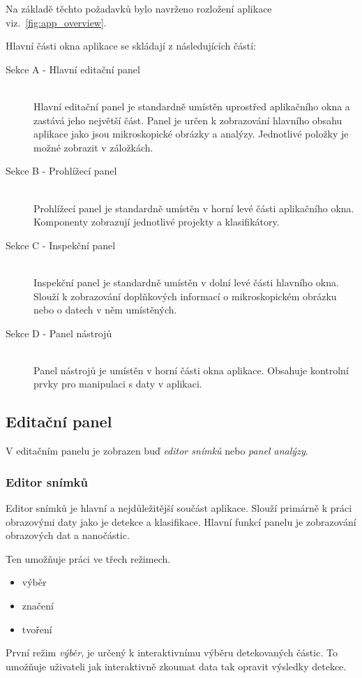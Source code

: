 \documentclass[11pt,twoside,a4paper,table]{book}
\begin{document}
Na základě těchto požadavků bylo navrženo rozložení aplikace viz.~\ref{fig:app_overview}. 

Hlavní části okna aplikace se skládají z následujících částí:
\begin{description}
	\item[Sekce A - Hlavní editační panel] \hfill \\
	Hlavní editační panel je standardně umístěn uprostřed aplikačního okna a zastává jeho největší část. Panel je určen k zobrazování hlavního obsahu aplikace jako jsou mikroskopické obrázky a analýzy. Jednotlivé položky je možné zobrazit v záložkách. 
	\item[Sekce B - Prohlížecí panel] \hfill \\
	Prohlížecí panel je standardně umístěn v horní levé části aplikačního okna. Komponenty zobrazují jednotlivé projekty a klasifikátory.
	\item[Sekce C - Inspekční panel] \hfill \\
	Inspekční panel je standardně umístěn v dolní levé části hlavního okna. Slouží k zobrazování doplňkových informací o mikroskopickém obrázku nebo o datech v něm umístěných.
	\item[Sekce D - Panel nástrojů] \hfill \\
	Panel nástrojů je umístěn v horní části okna aplikace. Obsahuje kontrolní prvky pro manipulaci s daty v aplikaci.
\end{description}
\subsection{Editační panel}
V editačním panelu je zobrazen buď \textit{editor snímků} nebo \textit{panel analýzy}.

\subsubsection{Editor snímků}
Editor snímků je hlavní a nejdůležitější součást aplikace. Slouží primárně k práci obrazovými daty jako je detekce a klasifikace. Hlavní funkcí panelu je zobrazování obrazových dat a nanočástic.

Ten umožňuje práci ve třech režimech.
\begin{itemize}
\item výběr
\item značení
\item tvoření
\end{itemize}

První režim \textit{výběr}, je určený k interaktivnímu výběru detekovaných částic. To umožňuje uživateli jak interaktivně zkoumat data tak opravit výsledky detekce.
\end{document}
